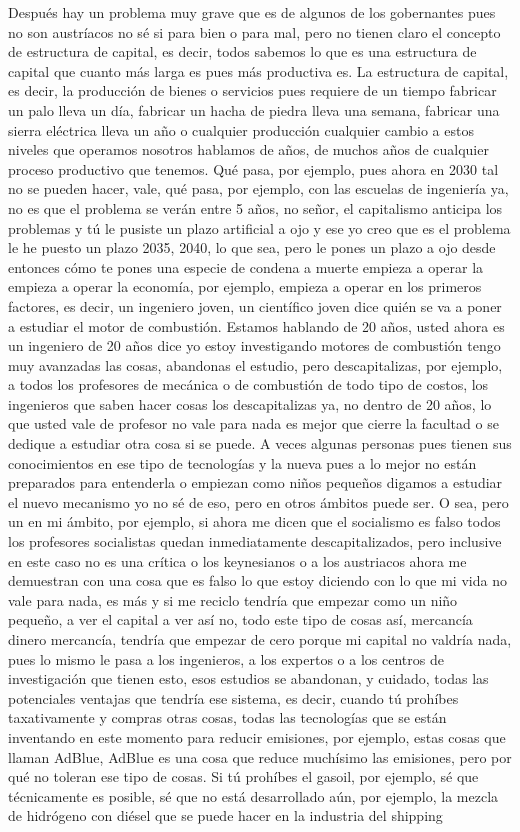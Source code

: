 Después hay un problema muy grave que es de algunos de los gobernantes pues no son austríacos no sé si para bien o para mal, pero no tienen claro el concepto de estructura de capital, es decir, todos sabemos lo que es una estructura de capital que cuanto más larga es pues más productiva es. La estructura de capital, es decir, la producción de bienes o servicios pues requiere de un tiempo fabricar un palo lleva un día, fabricar un hacha de piedra lleva una semana, fabricar una sierra eléctrica lleva un año o cualquier producción cualquier cambio a estos niveles que operamos nosotros hablamos de años, de muchos años de cualquier proceso productivo que tenemos.  Qué pasa, por ejemplo, pues ahora en 2030 tal no se pueden hacer, vale, qué pasa, por ejemplo, con las escuelas de ingeniería ya, no es que el problema se verán entre 5 años, no señor, el capitalismo anticipa los problemas y tú le pusiste un plazo artificial a ojo y ese yo creo que es el problema le he puesto un plazo 2035, 2040, lo que sea, pero le pones un plazo a ojo desde entonces cómo te pones una especie de condena a muerte empieza a operar la empieza a operar la economía, por ejemplo, empieza a operar en los primeros factores, es decir, un ingeniero joven, un científico joven dice quién se va a poner a estudiar el motor de combustión. Estamos hablando de 20 años, usted ahora es un ingeniero de 20 años dice yo estoy investigando motores de combustión tengo muy avanzadas las cosas, abandonas el estudio, pero descapitalizas, por ejemplo, a todos los profesores de mecánica o de combustión de todo tipo de costos, los ingenieros que saben hacer cosas los descapitalizas ya, no dentro de 20 años, lo que usted vale de profesor no vale para nada es mejor que cierre la facultad o se dedique a estudiar otra cosa si se puede. A veces algunas personas pues tienen sus conocimientos en ese tipo de tecnologías y la nueva pues a lo mejor no están preparados para entenderla o empiezan como niños pequeños digamos a estudiar el nuevo mecanismo yo no sé de eso, pero en otros ámbitos puede ser. O sea, pero un en mi ámbito, por ejemplo, si ahora me dicen que el socialismo es falso todos los profesores socialistas quedan inmediatamente descapitalizados, pero inclusive en este caso no es una crítica o los keynesianos o a los austriacos ahora me demuestran con una cosa que es falso lo que estoy diciendo con lo que mi vida no vale para nada, es más y si me reciclo tendría que empezar como un niño pequeño, a ver el capital a ver así no, todo este tipo de cosas así, mercancía dinero mercancía, tendría que empezar de cero porque mi capital no valdría nada, pues lo mismo le pasa a los ingenieros, a los expertos o a los centros de investigación que tienen esto, esos estudios se abandonan, y cuidado, todas las potenciales ventajas que tendría ese sistema, es decir, cuando tú prohíbes taxativamente y compras otras cosas, todas las tecnologías que se están inventando en este momento para reducir emisiones, por ejemplo, estas cosas que llaman AdBlue, AdBlue es una cosa que reduce muchísimo las emisiones, pero por qué no toleran ese tipo de cosas. Si tú prohíbes el gasoil, por ejemplo, sé que técnicamente es posible, sé que no está desarrollado aún, por ejemplo, la mezcla de hidrógeno con diésel que se puede hacer en la industria del shipping 